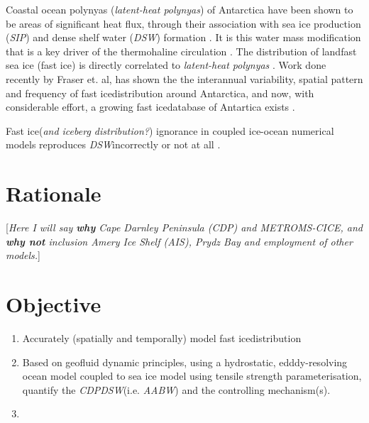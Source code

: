 \documentclass[11pt,a4paper]{article}
\newcommand{\sip}{\textit{SIP}} %
\newcommand{\dsw}{\textit{DSW}} %
\newcommand{\aabw}{\textit{AABW}} %
\newcommand{\fastice}{fast ice}
\newcommand{\Fastice}{Fast ice}
\newcommand{\cdp}{\textit{CDP}} %
\newcommand{\ais}{\textit{AIS}} %
\begin{document}
Coastal ocean polynyas (\textit{latent-heat polynyas}) of Antarctica have been shown to be areas of significant heat flux, through their association with sea ice production (\sip) and dense shelf water (\dsw) formation \citep{Massom1999,Maqueda2004,Williams2008,Ohshima2013,Nakayama2014,Ohshima2016,Williams2016,Kusahara2017b,Naughten2017}. It is this water mass modification that is a key driver of the thermohaline circulation \citep{Gawarkiewicz1995,Massom2001}. The distribution of landfast sea ice (\fastice) is directly correlated to \textit{latent-heat polynyas} \citep{Massom2001,Fraser2012,Ohshima2013,Kusahara2017a}. Work done recently by Fraser et. al, has shown the the interannual variability, spatial pattern and frequency of \fastice distribution around Antarctica, and now, with considerable effort, a growing \fastice database of Antartica exists \citet{Fraser2020}.

\Fastice (\textit{and iceberg distribution?}) ignorance in coupled ice-ocean numerical models reproduces \dsw incorrectly or not at all \citep{Ohshima2013,Nakayama2014,Liu2017,Fraser2019}.

\section*{Rationale}
%
[\textit{Here I will say \textbf{why} Cape Darnley Peninsula (\cdp) and METROMS-CICE, and \textbf{why not} inclusion Amery Ice Shelf (\ais), Prydz Bay and employment of other models.}]
\section*{Objective}
%
\begin{enumerate}
\item Accurately (spatially and temporally) model \fastice distribution
\item Based on geofluid dynamic principles, using a hydrostatic, edddy-resolving ocean model coupled to sea ice model using tensile strength parameterisation, quantify the \cdp \dsw (i.e. \aabw) and the controlling mechanism(s).
\item 
\end{enumerate}
\end{document}
